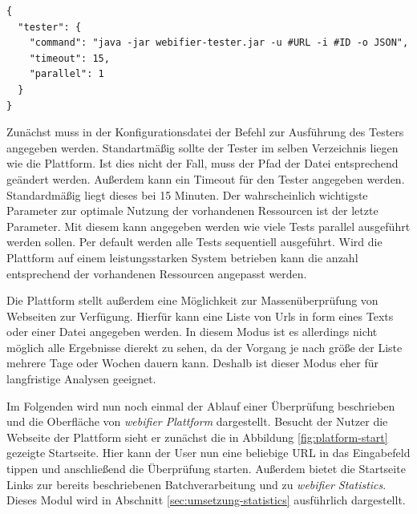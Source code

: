 \newpage

\begin{scriptsize}
\begin{lstlisting}
{
  "tester": {
    "command": "java -jar webifier-tester.jar -u #URL -i #ID -o JSON",
    "timeout": 15,
    "parallel": 1
  }
}
\end{lstlisting}
\end{scriptsize}

Zunächst muss in der Konfigurationsdatei der Befehl zur Ausführung des Testers angegeben werden. Standartmäßig sollte der Tester im selben Verzeichnis liegen wie die Plattform. Ist dies nicht der Fall, muss der Pfad der Datei entsprechend geändert werden. Außerdem kann ein Timeout für den Tester angegeben werden. Standardmäßig liegt dieses bei 15 Minuten. Der wahrscheinlich wichtigste Parameter zur optimale Nutzung der vorhandenen Ressourcen ist der letzte Parameter. Mit diesem kann angegeben werden wie viele Tests parallel ausgeführt werden sollen. Per default werden alle Tests sequentiell ausgeführt. Wird die Plattform auf einem leistungsstarken System betrieben kann die anzahl entsprechend der vorhandenen Ressourcen angepasst werden.

Die Plattform stellt außerdem eine Möglichkeit zur Massenüberprüfung von Webseiten zur Verfügung. Hierfür kann eine Liste von Urls in form eines Texts oder einer Datei angegeben werden. In diesem Modus ist es allerdings nicht möglich alle Ergebnisse dierekt zu sehen, da der Vorgang je nach größe der Liste mehrere Tage oder Wochen dauern kann. Deshalb ist dieser Modus eher für langfristige Analysen geeignet.

Im Folgenden wird nun noch einmal der Ablauf einer Überprüfung beschrieben und die Oberfläche von
\textit{webifier Plattform} dargestellt. Besucht der Nutzer die Webseite der Plattform sieht er
zunächst die in Abbildung \ref{fig:platform-start} gezeigte Startseite. Hier kann der User nun eine
beliebige \acs{URL} in das Eingabefeld tippen und anschließend die Überprüfung starten. Außerdem bietet
die Startseite Links zur bereits beschriebenen Batchverarbeitung und zu \textit{webifier
Statistics}. Dieses Modul wird in Abschnitt \ref{sec:umsetzung-statistics} ausführlich dargestellt.

